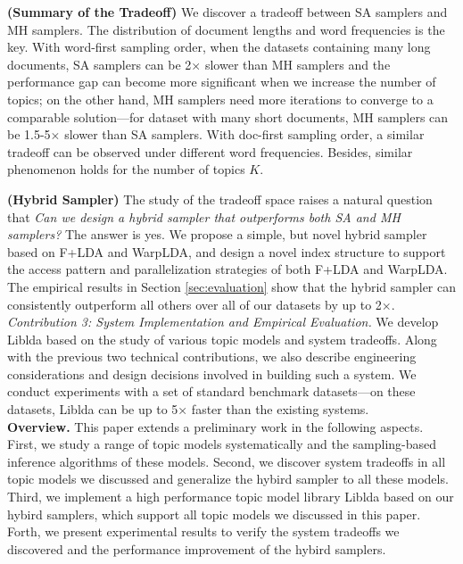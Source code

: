 \documentclass[10pt,journal,cspaper,compsoc]{IEEEtran}
\begin{document}
\vspace{0.5em}
\noindent
{\bf (Summary of the Tradeoff)} We discover a tradeoff
between SA samplers and MH samplers. The distribution of
document lengths and word frequencies is the key. With word-first sampling order, when
the datasets containing many long documents, SA samplers can be 2$\times$ slower than MH samplers and the performance gap can become more significant when we increase the number of topics; on the other hand, MH samplers need more iterations to converge
to a comparable solution---for dataset with many short documents, MH samplers can be 1.5-5$\times$ slower than SA samplers. With doc-first sampling order,
a similar tradeoff can be observed under different 
word frequencies. Besides, similar phenomenon holds for the number of topics $K$.

\vspace{0.5em}
\noindent
{\bf (Hybrid Sampler)}
The study of the tradeoff space raises a natural question that {\em Can we
	design a hybrid sampler that outperforms both SA and MH samplers?}
The answer is yes. We propose a simple, but novel
hybrid sampler based on F+LDA and WarpLDA, and design a
novel index structure to support the access pattern
and parallelization strategies of both F+LDA and WarpLDA.
The empirical results in Section \ref{sec:evaluation} show that
the hybrid sampler can consistently outperform all others over
all of our datasets by up to 2$\times$.
\\

\noindent
{\large \em Contribution 3: System Implementation and Empirical Evaluation.} We develop Liblda based on the study of various topic models and system tradeoffs.
Along with the previous two technical contributions, we also describe engineering considerations and design decisions involved in building such a system. 
We conduct experiments with a set of standard benchmark datasets---on these datasets, Liblda can be up to 5× faster than the existing systems.
\\

\noindent
{\bf Overview.} This paper extends a preliminary work\cite{yut2017lda} in the following aspects. First, we study a range of topic models systematically and the sampling-based inference algorithms of these models. Second, we discover system tradeoffs in all topic models we discussed and generalize 
the hybird sampler to all these models. Third, we implement a high performance topic model library Liblda based on our hybird samplers,
which support all topic models we discussed in 
this paper. Forth, we present experimental results to verify the system tradeoffs we discovered and the performance improvement of the hybird samplers. 
\end{document}
